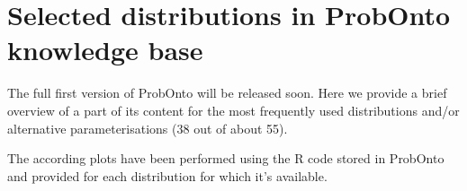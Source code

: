 

\chapter{Selected distributions in ProbOnto knowledge base}
\label{ch:probontoAppendix}

The full first version of ProbOnto will be released soon. Here we provide 
a brief overview of a part of its content for the most frequently used distributions 
and/or alternative parameterisations (38 out of about 55). 

The according plots have been performed using the R code stored in ProbOnto 
and provided for each distribution for which it's available.


